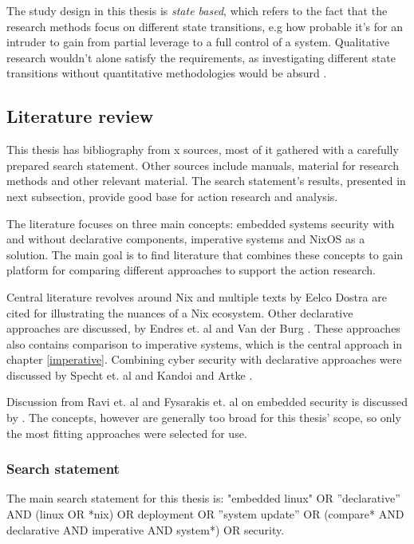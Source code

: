 The study design in this thesis is \textit{state based}, which refers
to the fact that the research methods focus on different state
transitions, e.g how probable it's for an intruder to gain from
partial leverage to a full control of a system. Qualitative research
wouldn't alone satisfy the requirements, as investigating different
state transitions without quantitative methodologies would be absurd
\cite{ramos2017model}.

\subsection{Literature review}\label{litrev}

This thesis has bibliography from x sources, most of it gathered with
a carefully prepared search statement. Other sources include manuals,
material for research methods and other relevant material. The search
statement's results, presented in next subsection, provide good base
for action research and analysis.

The literature focuses on three main concepts: embedded systems
security with and without declarative components, imperative systems
and NixOS as a solution. The main goal is to find literature that
combines these concepts to gain platform for comparing different
approaches to support the action research.

Central literature revolves around Nix and multiple texts by Eelco
Dostra are cited for illustrating the nuances of a Nix
ecosystem. Other declarative approaches are discussed, by Endres
et. al and Van der Burg \cite{van2010declarative,
  endres2017declarative}. These approaches also contains comparison to
imperative systems, which is the central approach in chapter
\ref{imperative}. Combining cyber security with declarative approaches
were discussed by Specht et. al and Kandoi and Artke
\cite{specht2007analysis, kandoi2021operating}.

Discussion from Ravi et. al and Fysarakis et. al on embedded security is discussed by
\cite{ravi2004security, fysarakis2014embedded}. The concepts, however
are generally too broad for this thesis' scope, so only the most
fitting approaches were selected for use.

\subsubsection{Search statement} \label{searchstatement}

The main search statement for this thesis is: "embedded linux" OR
''declarative'' AND (linux OR *nix) OR deployment OR ''system update''
OR (compare* AND declarative AND imperative AND system*) OR security.

